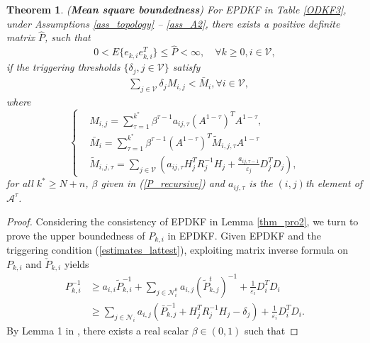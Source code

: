 \documentclass[journal,transmag]{IEEEtran}
\newtheorem{theorem}{\textbf{Theorem}}
\begin{document}
{	\begin{theorem}\label{thm_consistent2}
		(\textbf{Mean square boundedness}) For EPDKF in Table \ref{ODKF3},	under Assumptions \ref{ass_topology} -- \ref{ass_A2},
		there exists a positive definite matrix $\hat P$, such that
		\begin{equation}\label{thm_compare22}
		0<E\{e_{k,i}e_{k,i}^T\}\leq \hat P<\infty, \quad  \forall k\geq 0, i\in \mathcal{V},
		\end{equation}
		if 	the triggering thresholds $\{\delta_{j},j\in \mathcal{V}\}$ satisfy
		\begin{equation}\label{delta_condition120}
		\begin{split}
		&\sum_{j\in \mathcal{V}}\delta_{j}M_{i,j}
		<\bar M_{i}, \forall  i\in \mathcal{V},
		\end{split}
		\end{equation}
		where
		\begin{equation}\label{delta_condition1200}
						\left\{
		\begin{aligned}
&M_{i,j}=\sum_{\tau=1}^{k^{*}}\beta^{\tau-1}a_{ij,\tau}(A^{1-\tau})^{T}A^{1-\tau}, \\
&\bar M_{i}=\sum_{\tau=1}^{k^{*}}\beta^{\tau-1}(A^{1-\tau})^{T}\tilde M_{i,j,\tau}A^{1-\tau}\\
&\tilde M_{i,j,\tau}=\sum_{j\in \mathcal{V}}(a_{ij,\tau}H_{j}^TR_{j}^{-1}H_{j}+\frac{a_{ij,\tau-1}}{\varepsilon_j }D_{j}^TD_{j}),
		\end{aligned}
		\right.
		\end{equation}
		for all $k^{*}\geq N+n$, $\beta$ given in  (\ref{P_recursive}) and
		$a_{ij,\tau}$ is the $(i,j)$th element of $\mathcal{A}^\tau$.
	\end{theorem}
	\begin{proof}
		Considering the consistency of EPDKF in Lemma \ref{thm_pro2}, we turn to prove  the  upper boundedness of $P_{k,i}$ in EPDKF.
		Given EPDKF and the triggering condition  (\ref{estimates_lattest}),  exploiting  matrix inverse formula on $P_{k,i}$ and $\check P_{k,i}$ yields
		\begin{align}\label{proof_stability213}
		P_{k,i}^{-1}&\geq a_{i,i}\tilde P_{k,i}^{-1}+\sum_{j\in \mathcal{N}_{i}^0}a_{i,j}  (\tilde P_{k,j}^t)^{-1}+\frac{1}{\varepsilon_i }D_{i}^TD_{i}\nonumber\\
		&\geq\sum_{j\in \mathcal{N}_{i}}a_{i,j} (\bar P_{k,j}^{-1}+H_{j}^TR_{j}^{-1}H_{j}-\delta_{j})+\frac{1}{\varepsilon_i }D_{i}^TD_{i}.
		\end{align}	
		By Lemma 1 in \cite{Battistelli2014Kullback}, 	there exists a real scalar $\beta\in(0,1)$ such that

\end{proof}}
\end{document}
